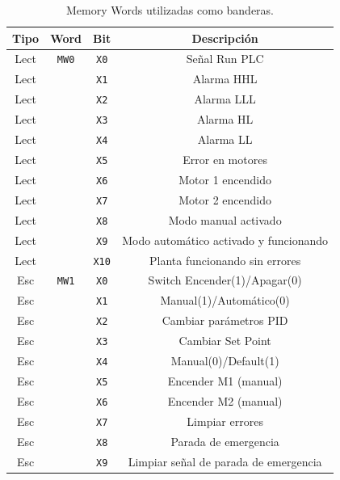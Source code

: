 \begin{table}[!t]
\renewcommand{\arraystretch}{1.3}
\centering
\begin{tabular}{c||c||c||c}
\hline
\bfseries Tipo & \bfseries Word & \bfseries Bit & \bfseries Descripción\\
\hline \hline
Lect & \verb|MW0| & \verb|X0| & Señal Run PLC\\
Lect & & \verb|X1| & Alarma HHL\\
Lect & & \verb|X2|& Alarma LLL\\
Lect & & \verb|X3|& Alarma HL\\
Lect & & \verb|X4|& Alarma LL\\
Lect & & \verb|X5|& Error en motores\\
Lect & & \verb|X6|& Motor 1 encendido\\
Lect & & \verb|X7|& Motor 2 encendido\\
Lect & & \verb|X8|& Modo manual activado\\
Lect & & \verb|X9|& Modo automático activado y funcionando\\
Lect & & \verb|X10|& Planta funcionando sin errores\\
\hline
Esc & \verb|MW1| & \verb|X0|& Switch Encender(1)/Apagar(0)\\
Esc & & \verb|X1|& Manual(1)/Automático(0)\\
Esc & & \verb|X2|& Cambiar parámetros PID\\
Esc & & \verb|X3|& Cambiar Set Point\\
Esc & & \verb|X4|& Manual(0)/Default(1)\\
Esc & & \verb|X5|& Encender M1 (manual)\\
Esc & & \verb|X6|& Encender M2 (manual)\\
Esc & & \verb|X7|& Limpiar errores\\
Esc & & \verb|X8|& Parada de emergencia\\
Esc & & \verb|X9|& Limpiar señal de parada de emergencia\\
\hline
\end{tabular}
\caption{Memory Words utilizadas como banderas.}
\label{table:mwBanderas}
\end{table}

